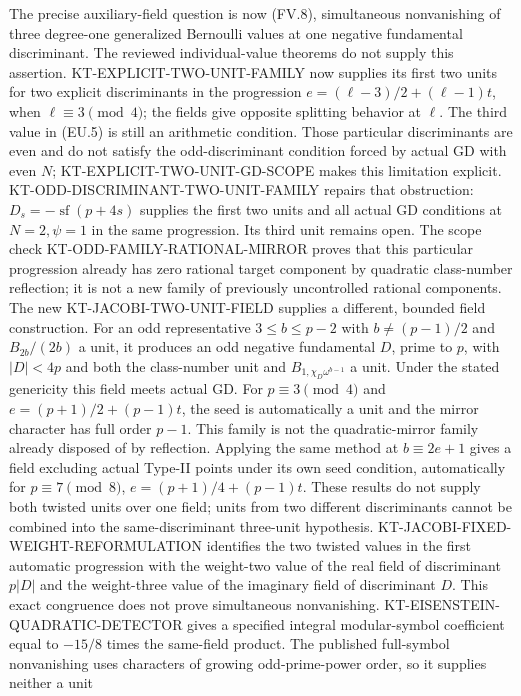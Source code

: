 \documentclass[11pt,a4paper]{article}
\theoremstyle{definition}
\begin{document}
The precise auxiliary-field question is now (FV.8), simultaneous
nonvanishing of three degree-one generalized Bernoulli values
at one negative fundamental discriminant. The reviewed
individual-value theorems do not supply this assertion.
KT-EXPLICIT-TWO-UNIT-FAMILY now supplies its first two
units for two explicit discriminants in the progression
$e=(\ell-3)/2+(\ell-1)t$, when $\ell\equiv3\pmod4$;
the fields give opposite splitting behavior at $\ell$.
The third value in (EU.5) is still an arithmetic condition.
Those particular discriminants are even and do not satisfy
the odd-discriminant condition forced by actual GD with even
$N$; KT-EXPLICIT-TWO-UNIT-GD-SCOPE makes this limitation explicit.
KT-ODD-DISCRIMINANT-TWO-UNIT-FAMILY repairs that obstruction:
$D_s=-\operatorname{sf}(p+4s)$ supplies the first two units
and all actual GD conditions at $N=2,\psi=1$ in the same
progression. Its third unit remains open. The scope check
KT-ODD-FAMILY-RATIONAL-MIRROR proves that this particular
progression already has zero rational target component by
quadratic class-number reflection; it is not a new family of
previously uncontrolled rational components.
The new KT-JACOBI-TWO-UNIT-FIELD supplies a different, bounded
field construction. For an odd representative $3\le b\le p-2$
with $b\ne(p-1)/2$ and $B_{2b}/(2b)$ a unit, it produces
an odd negative fundamental $D$, prime to $p$, with $|D|<4p$
and both the class-number unit and $B_{1,\chi_D\omega^{b-1}}$
a unit. Under the stated genericity this field meets actual GD.
For $p\equiv3\pmod4$ and $e=(p+1)/2+(p-1)t$, the seed
is automatically a unit and the mirror character has full
order $p-1$. This family is not the quadratic-mirror family
already disposed of by reflection. Applying the same method
at $b\equiv2e+1$ gives a field excluding actual Type-II points
under its own seed condition, automatically for
$p\equiv7\pmod8$, $e=(p+1)/4+(p-1)t$.
These results do not supply both twisted units over one field;
units from two different discriminants cannot be combined into
the same-discriminant three-unit hypothesis.
KT-JACOBI-FIXED-WEIGHT-REFORMULATION identifies the two twisted
values in the first automatic progression with the weight-two
value of the real field of discriminant $p|D|$ and the
weight-three value of the imaginary field of discriminant $D$.
This exact congruence does not prove simultaneous nonvanishing.
KT-EISENSTEIN-QUADRATIC-DETECTOR gives a specified integral
modular-symbol coefficient equal to $-15/8$ times the same-field
product. The published full-symbol nonvanishing uses characters
of growing odd-prime-power order, so it supplies neither a unit
\end{document}
